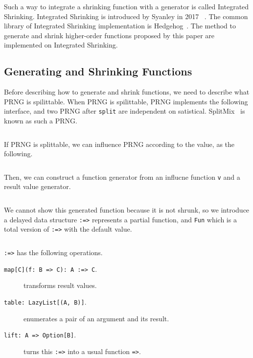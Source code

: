\documentclass[a4paper,10pt]{article}
\theoremstyle{definition}
\begin{document}
Such a way to integrate a shrinking function with a generator is called Integrated Shrinking.
Integrated Shrinking is introduced by Syanley in 2017 ~\cite{stanley_gens_2017}.
The common library of Integrated Shrinking implementation is Hedgehog~\cite{hedgehog_online}.
The method to generate and shrink higher-order functions proposed by this paper are implemented on Integrated Shrinking.

\subsection{Generating and Shrinking Functions}

Before describing how to generate and shrink functions, we need to describe what PRNG is spilittable.
When PRNG is spilittable, PRNG implements the following interface, and two PRNG after \texttt{split} are independent on satistical.
SplitMix~\cite{steele_jr_fast_2014} is known as such a PRNG.

\inputminted[breaklines,firstline=4,lastline=7]{scala}{../src/main/scala/minicheck.scala}

If PRNG is splittable, we can influence PRNG according to the value, as the following.

\inputminted[breaklines,firstline=68,lastline=70]{scala}{../src/main/scala/minicheck.scala}

Then, we can construct a function generator from an influcne function \texttt{v} and a result value generator.

\inputminted[breaklines,firstline=72,lastline=73]{scala}{../src/main/scala/minicheck.scala}

We cannot show this generated function because it is not shrunk,
so we introduce a delayed data structure \texttt{:=>} represents a partial function,
and \texttt{Fun} which is a total version of \texttt{:=>} with the default value.

\inputminted[breaklines,firstline=75,lastline=108]{scala}{../src/main/scala/minicheck.scala}

\texttt{:=>} has the following operations.

\begin{description}
  \item[\texttt{map[C](f: B => C): A :=> C}.] transforms result values.
  \item[\texttt{table: LazyList[(A, B)]}.] enumerates a pair of an argument and its result.
  \item[\texttt{lift: A => Option[B]}.] turns this \texttt{:=>} into a usual function \texttt{=>}.
\end{description}
\end{document}
